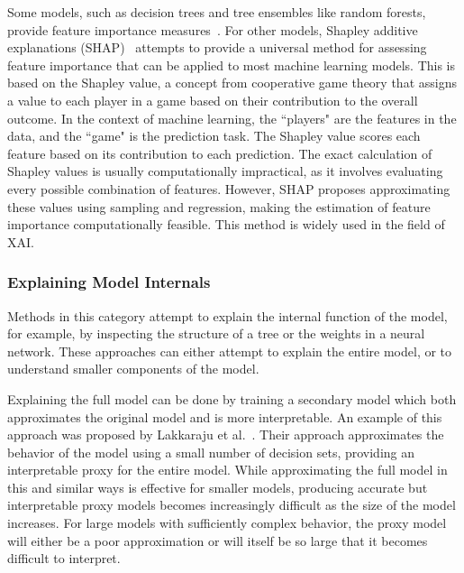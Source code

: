 \documentclass[graybox]{svmult}
\begin{document}
Some models, such as decision trees and tree ensembles like random forests, 
provide feature importance measures~\cite{randForest_Breiman_ML_01}. 
For other models, Shapley additive explanations (SHAP)~\cite{SHAP_Lundberg_NeurIPS_17} 
attempts to provide a universal method for assessing feature importance 
that can be applied to most machine learning models. 
This is based on the Shapley value, 
a concept from cooperative game theory that assigns a value to each player in a game 
based on their contribution to the overall outcome. 
In the context of machine learning, 
the ``players" are the features in the data, and the ``game" is the prediction task. 
The Shapley value scores each feature based on its contribution to each prediction. 
The exact calculation of Shapley values is usually computationally impractical, 
as it involves evaluating every possible combination of features. 
However, SHAP proposes approximating these values using sampling and regression, 
making the estimation of feature importance computationally feasible. 
This method is widely used in the field of XAI.

\subsubsection{Explaining Model Internals}

Methods in this category attempt to explain the internal function of the model, 
for example, by inspecting the structure of a tree or the weights in a neural network. 
These approaches can either attempt to explain the entire model, 
or to understand smaller components of the model.

Explaining the full model can be done by training a secondary model 
which both approximates the original model and is more interpretable. 
An example of this approach was proposed by 
Lakkaraju et al.~\cite{lakkarajuInterpretableExplorableApproximations2017}. 
Their approach approximates the behavior of the model using a small number of decision sets, 
providing an interpretable proxy for the entire model. 
While approximating the full model in this and similar ways is effective for smaller models, 
producing accurate but interpretable proxy models 
becomes increasingly difficult as the size of the model increases. 
For large models with sufficiently complex behavior, 
the proxy model will either be a poor approximation 
or will itself be so large that it becomes difficult to interpret.
\end{document}
